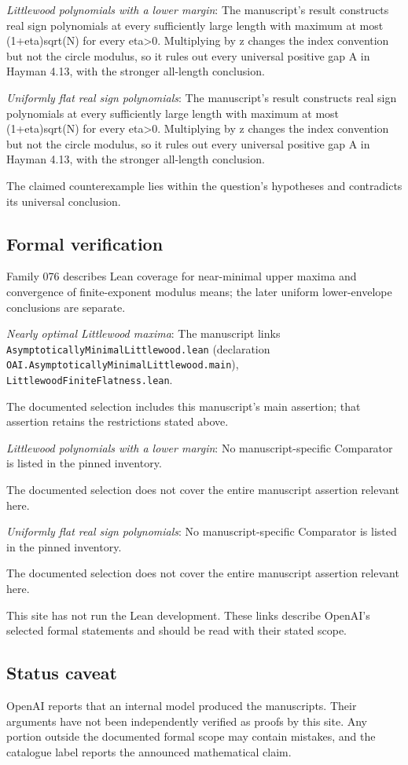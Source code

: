 \documentclass[11pt]{article}
\begin{document}
\textit{Littlewood polynomials with a lower margin}: The manuscript’s result constructs real sign polynomials at every sufficiently large length with maximum at most (1+eta)sqrt(N) for every eta>0. Multiplying by z changes the index convention but not the circle modulus, so it rules out every universal positive gap A in Hayman 4.13, with the stronger all-length conclusion.

\textit{Uniformly flat real sign polynomials}: The manuscript’s result constructs real sign polynomials at every sufficiently large length with maximum at most (1+eta)sqrt(N) for every eta>0. Multiplying by z changes the index convention but not the circle modulus, so it rules out every universal positive gap A in Hayman 4.13, with the stronger all-length conclusion.

The claimed counterexample lies within the question’s hypotheses and contradicts its universal conclusion.

\subsection{Formal verification}
Family 076 describes Lean coverage for near-minimal upper maxima and convergence of finite-exponent modulus means; the later uniform lower-envelope conclusions are separate.

\textit{Nearly optimal Littlewood maxima}: The manuscript links \texttt{AsymptoticallyMinimalLittlewood.lean} (declaration \texttt{OAI.AsymptoticallyMinimalLittlewood.main}), \texttt{LittlewoodFiniteFlatness.lean}.

The documented selection includes this manuscript’s main assertion; that assertion retains the restrictions stated above.

\textit{Littlewood polynomials with a lower margin}: No manuscript-specific Comparator is listed in the pinned inventory.

The documented selection does not cover the entire manuscript assertion relevant here.

\textit{Uniformly flat real sign polynomials}: No manuscript-specific Comparator is listed in the pinned inventory.

The documented selection does not cover the entire manuscript assertion relevant here.

This site has not run the Lean development. These links describe OpenAI’s selected formal statements and should be read with their stated scope.

\subsection{Status caveat}
OpenAI reports that an internal model produced the manuscripts. Their arguments have not been independently verified as proofs by this site. Any portion outside the documented formal scope may contain mistakes, and the catalogue label reports the announced mathematical claim.
\end{document}
